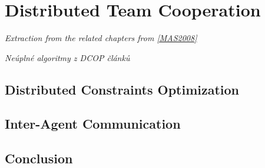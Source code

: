 \chapter{Distributed Team Cooperation}
\emph{Extraction from the related chapters from \ref{MAS2008}}

\emph{Neúplné algoritmy z DCOP článků}

\section{Distributed Constraints Optimization}

\section{Inter-Agent Communication}
\label{sec_communication}

\section{Conclusion}
